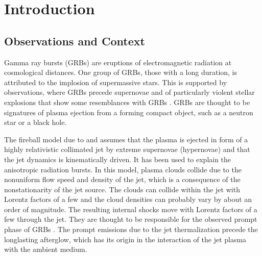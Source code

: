 \documentclass[structabstract]{aa}
\begin{document}
\maketitle

\section{Introduction}
\subsection{Observations and Context}
Gamma ray bursts (GRBs) are eruptions of electromagnetic radiation at 
cosmological distances. One group of GRBs, those with a long duration, 
is attributed to the implosion of supermassive stars. This is supported 
by observations, where GRBs precede supernovae \citep{Hjorth:2003zl} and
of particularly violent stellar explosions that show some resemblances
with GRBs \citep{Kulkarni:1998lh}. GRBs are thought to be signatures of 
plasma ejection from a forming compact object, such as a neutron star 
or a black hole. 

The fireball model due to \citet{Meszaros:1992xq} and \citet{Rees:1994df} 
assumes that the plasma is ejected in form of a highly relativistic 
collimated jet by extreme supernovae (hypernovae) and
that the jet dynamics is kinematically driven. It has been used to 
explain the anisotropic radiation bursts. In this model, plasma 
clouds collide due to the nonuniform flow speed and density of the jet, 
which is a consequence of the nonstationarity of the jet source. The 
clouds can collide within the jet with Lorentz factors of a few and the 
cloud densities can probably vary by about an order of magnitude. The 
resulting internal shocks move with Lorentz factors of a few through 
the jet. They are thought to be responsible for the observed prompt phase 
of GRBs \citep{Piran:1999jt,Fox:2006vs}. The prompt emissions due to the 
jet thermalization precede the longlasting afterglow, which has its origin 
in the interaction of the jet plasma with the ambient medium.
\end{document}
